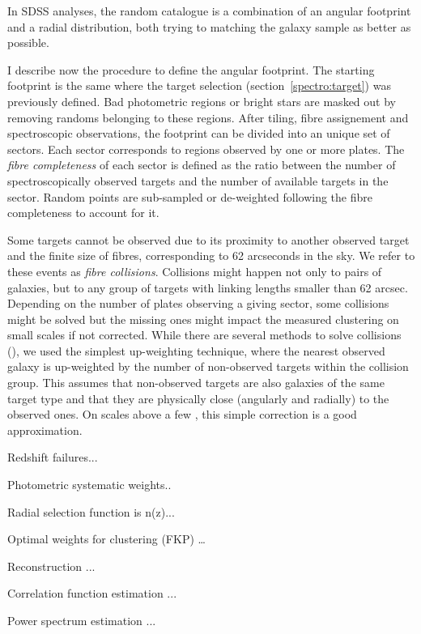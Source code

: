 In SDSS analyses, the random catalogue is a combination of an angular footprint 
and a radial distribution, both trying to matching the galaxy sample as better as possible. 

I describe now the procedure to define the angular footprint. 
The starting footprint is the same where the target selection 
(section~\ref{spectro:target})
was previously defined. Bad photometric regions or bright stars are masked out 
by removing randoms belonging to these regions. 
After tiling, fibre assignement and spectroscopic observations, the footprint 
can be divided into an unique set of sectors. Each sector corresponds to regions
observed by one or more plates. The \emph{fibre completeness} of each sector is 
defined as the ratio between the number of spectroscopically observed targets and 
the number of available targets in the sector. Random points are sub-sampled or de-weighted 
following the fibre completeness to account for it. 

Some targets cannot be observed due to 
its proximity to another observed target and the finite size of fibres, corresponding 
to 62 arcseconds in the sky. We refer to these events as \emph{fibre collisions}. 
Collisions might happen not only to pairs of galaxies, but to any group of targets with 
linking lengths smaller than 62 arcsec. Depending on the number of plates observing 
a giving sector, some collisions might be solved but the missing ones might 
impact the measured clustering on small scales if not corrected. 
While there are several methods to solve collisions 
(\cite{guoNewMethodCorrect2012, bianchiUnbiasedClusteringEstimation2017}),
we used the simplest up-weighting technique, where the nearest observed galaxy 
is up-weighted by the number of non-observed targets within the collision group. 
This assumes that non-observed targets are also galaxies of the same target type and 
that they are physically close (angularly and radially) to the observed ones.
On scales above a few \hmpc, this simple correction is a good approximation. 

Redshift failures... 

Photometric systematic weights.. 

Radial selection function is n(z)... 

Optimal weights for clustering (FKP) \dots




Reconstruction ... 

Correlation function estimation ... 

Power spectrum estimation ... 

